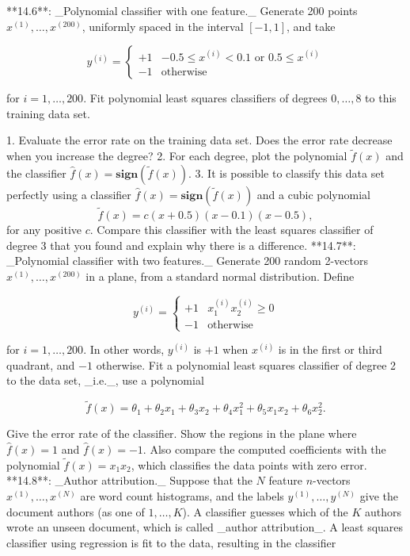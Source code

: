 

**14.6**: _Polynomial classifier with one feature._ Generate 200 points \(x^{(1)},\ldots,x^{(200)}\), uniformly spaced in the interval \([-1,1]\), and take

\[y^{(i)}=\left\{\begin{array}{ll}+1&-0.5\leq x^{(i)}<0.1\text{ or }0.5\leq x^{(i)} \\ -1&\text{otherwise}\end{array}\right.\]

for \(i=1,\ldots,200\). Fit polynomial least squares classifiers of degrees \(0,\ldots,8\) to this training data set.

1. Evaluate the error rate on the training data set. Does the error rate decrease when you increase the degree?
2. For each degree, plot the polynomial \(\tilde{f}(x)\) and the classifier \(\hat{f}(x)=\mathbf{sign}(\tilde{f}(x))\).
3. It is possible to classify this data set perfectly using a classifier \(\hat{f}(x)=\mathbf{sign}(\tilde{f}(x))\) and a cubic polynomial \[\tilde{f}(x)=c(x+0.5)(x-0.1)(x-0.5),\] for any positive \(c\). Compare this classifier with the least squares classifier of degree 3 that you found and explain why there is a difference.
**14.7**: _Polynomial classifier with two features._ Generate 200 random 2-vectors \(x^{(1)},\ldots,x^{(200)}\) in a plane, from a standard normal distribution. Define

\[y^{(i)}=\left\{\begin{array}{ll}+1&x_{1}^{(i)}x_{2}^{(i)}\geq 0\\ -1&\text{otherwise}\end{array}\right.\]

for \(i=1,\ldots,200\). In other words, \(y^{(i)}\) is \(+1\) when \(x^{(i)}\) is in the first or third quadrant, and \(-1\) otherwise. Fit a polynomial least squares classifier of degree 2 to the data set, _i.e._, use a polynomial

\[\tilde{f}(x)=\theta_{1}+\theta_{2}x_{1}+\theta_{3}x_{2}+\theta_{4}x_{1}^{2}+ \theta_{5}x_{1}x_{2}+\theta_{6}x_{2}^{2}.\]

Give the error rate of the classifier. Show the regions in the plane where \(\hat{f}(x)=1\) and \(\hat{f}(x)=-1\). Also compare the computed coefficients with the polynomial \(\tilde{f}(x)=x_{1}x_{2}\), which classifies the data points with zero error.
**14.8**: _Author attribution._ Suppose that the \(N\) feature \(n\)-vectors \(x^{(1)},\ldots,x^{(N)}\) are word count histograms, and the labels \(y^{(1)},\ldots,y^{(N)}\) give the document authors (as one of \(1,\ldots,K\)). A classifier guesses which of the \(K\) authors wrote an unseen document, which is called _author attribution_. A least squares classifier using regression is fit to the data, resulting in the classifier

